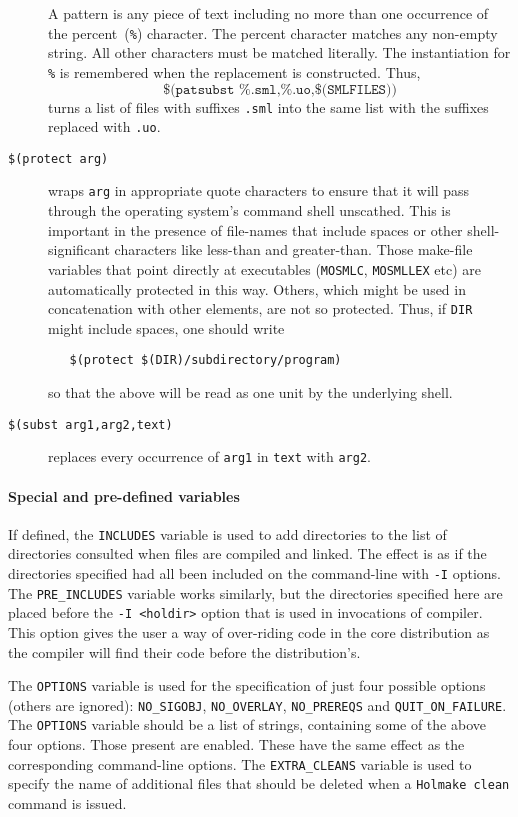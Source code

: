 \begin{description}
  A pattern is any piece of text including no more than one occurrence
  of the percent~(\texttt{\%}) character.  The percent character
  matches any non-empty string.  All other characters must be matched
  literally.  The instantiation for \texttt{\%} is remembered when the
  replacement is constructed.  Thus, \[
    \texttt{\$(patsubst \%.sml,\%.uo,\$(SMLFILES))}
   \] turns a list of files with suffixes \texttt{.sml} into the same
  list with the suffixes replaced with \texttt{.uo}.
\item[\texttt{\$(protect arg)}] wraps \texttt{arg} in appropriate
  quote characters to ensure that it will pass through the operating
  system's command shell unscathed.  This is important in the presence
  of file-names that include spaces or other shell-significant
  characters like less-than and greater-than.  Those make-file
  variables that point directly at executables (\texttt{MOSMLC},
  \texttt{MOSMLLEX} etc) are automatically protected in this way.
  Others, which might be used in concatenation with other elements,
  are not so protected.  Thus, if \texttt{DIR} might include spaces,
  one should write
\begin{verbatim}
   $(protect $(DIR)/subdirectory/program)
\end{verbatim}
  so that the above will be read as one unit by the underlying shell.
\item[\texttt{\$(subst arg1,arg2,text)}] replaces every occurrence
  of \texttt{arg1} in \texttt{text} with \texttt{arg2}.
\end{description}

\paragraph{Special and pre-defined variables}

If defined, the \texttt{INCLUDES} variable is used to add directories
to the list of directories consulted when files are compiled and
linked.  The effect is as if the directories specified had all been
included on the command-line with \texttt{-I} options.  The
\texttt{PRE\_INCLUDES} variable works similarly, but the directories
specified here are placed before the \mbox{\texttt{-I <holdir>}}
option that is used in invocations of compiler.  This
option gives the user a way of over-riding code in the core
distribution as the compiler will find their code
before the distribution's.

The \texttt{OPTIONS} variable is used for the specification of just
four possible options (others are ignored): \texttt{NO\_SIGOBJ},
\texttt{NO\_OVERLAY}, \texttt{NO\_PREREQS} and
\texttt{QUIT\_ON\_FAILURE}.  The \texttt{OPTIONS} variable should be a
list of strings, containing some of the above four options.  Those
present are enabled.  These have the same effect as the corresponding
command-line options. The \texttt{EXTRA\_CLEANS} variable is used to
specify the name of additional files that should be deleted when a
\texttt{Holmake clean} command is issued.

